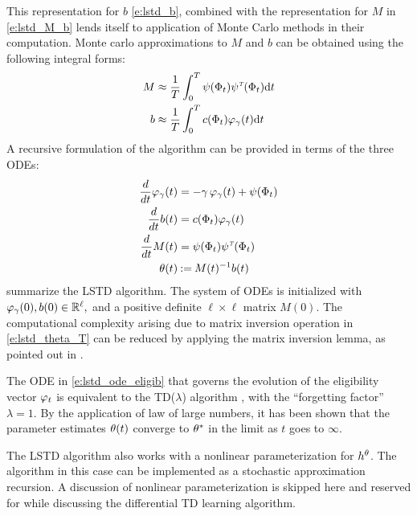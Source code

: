 This representation for $b$ \eqref{e:lstd_b}, combined with the representation for $M$ in \eqref{e:lstd_M_b} lends itself to application of Monte Carlo methods in their computation. Monte carlo approximations to $M$ and $b$ can be obtained using the following integral forms:
\begin{subequations}
\begin{align}
M &\approx \frac{1}{T} \int_0^T  \basis(\markovstate_t) \basis^\transpose(\markovstate_t) \ud t
\label{e:lstd_M_T}
\\
b & \approx  \frac{1}{T} \int_0^T c(\markovstate_t) \eligibvector_\discount(t) \ud t
\label{e:lstd_b_T}
\end{align}
\end{subequations}
A recursive formulation of the algorithm can be provided in terms of the three ODEs:
\begin{subequations}
\begin{align}
\ddt \eligibvector_\discount (t) &= - \discount\, \eligibvector_\discount(t) + \basis (\markovstate_t) 
\label{e:lstd_ode_eligib} \\
\ddt b(t) &=  c(\markovstate_t)\eligibvector_\discount(t)
 \label{e:lstd_ode_b}\\
\ddt M(t) &= \basis(\markovstate_t) \basis^\transpose(\markovstate_t) 
\label{e:lstd_ode_M} \\
\param(t) &\eqdef  M(t)^{-1} b(t)
\label{e:lstd_theta_T}
\end{align}
\end{subequations}
 summarize the LSTD algorithm. The system of ODEs is initialized with $\varphi_\gamma(0), b(0) \in \mathbb{R}^\ell,$ and a positive definite $\ell \times \ell$ matrix $M(0)$. The computational complexity arising due to matrix inversion operation in \eqref{e:lstd_theta_T} can be reduced by applying the matrix inversion lemma, as pointed out in \cite{ctcn}. 

The ODE in \eqref{e:lstd_ode_eligib} that governs the evolution of the eligibility vector $\varphi_t$ is equivalent to the TD($\lambda$) algorithm \cite{}, with the ``forgetting factor'' $\lambda = 1$. By the application of law of large numbers, it has been shown that the parameter estimates $\theta(t)$ converge to $\theta^*$ in the limit as $t$ goes to $\infty$. 

The LSTD algorithm also works with a nonlinear parameterization for $h^\theta$. The algorithm in this case can be implemented as a stochastic approximation recursion. A discussion of nonlinear parameterization is skipped here and reserved for  while discussing the differential TD learning algorithm. 

